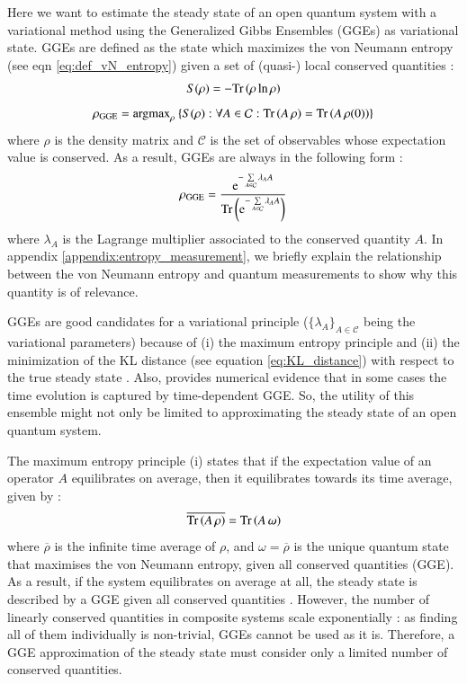 Here we want to estimate the steady state of an open quantum system with a variational method using the Generalized Gibbs Ensembles (GGEs) as variational state. GGEs are defined as the state which maximizes the von Neumann entropy (see eqn \ref{eq:def_vN_entropy}) given a set of (quasi-) local conserved quantities \cite{gogolin2016equilibration}:
\begin{equation}
\label{eq:def_vN_entropy}
S(\rho) = - \mathrm{Tr}\left(  \rho \ln \rho \right)
\end{equation}
\begin{equation}
\label{eq:def_GGE}
\rho_{\rm GGE} = \mathrm{argmax}_\rho \: \{ S(\rho): \\
\forall A \in \mathcal{C} : \mathrm{Tr}\left(  A \, \rho \right) = \mathrm{Tr}\left(  A \, \rho(0) \right) \}
\end{equation}
where $ \rho$ is the density matrix and $\mathcal{C}$ is the set of observables whose expectation value is conserved. As a result, GGEs are always \cite{gogolin2016equilibration} in the following form :
\begin{equation}
    \label{eq:shape_GGEs}
    \rho_{\rm GGE} = \frac{{\rm e}^{- \sum\limits_{A \in \mathcal{C}} \lambda_A A}}{\mathrm{Tr}\left( {\rm e}^{- \sum\limits_{A \in \mathcal{C}} \lambda_A A} \right)}
\end{equation}
where $\lambda_A$ is the Lagrange multiplier associated to the conserved quantity $A$.
In appendix \ref{appendix:entropy_measurement}, we briefly explain the relationship between the von Neumann entropy and quantum measurements to show why this quantity is of relevance. 

GGEs are good candidates for a variational principle ($\{ \lambda_A \}_{A \in \mathcal{C}}$ being the variational parameters) because of (i) the maximum entropy principle \cite{gogolin2016equilibration} and (ii) the minimization of the KL distance (see equation \ref{eq:KL_distance}) with respect to the true steady state \cite{sels2015stationary}. 
Also, \cite{lange2018time} provides numerical evidence that in some cases the time evolution is captured by time-dependent GGE. 
So, the utility of this ensemble might not only be limited to approximating the steady state of an open quantum system.

The maximum entropy principle (i) states \cite{gogolin2016equilibration} that if the expectation value of an operator $A$ equilibrates on average, then it equilibrates towards its time average, given by :
\begin{equation}
    \label{eq:max_entropy_principle}
    \overline{\mathrm{Tr}\left( A \, \rho \right)} = \mathrm{Tr}\left( A \, \omega \right)
\end{equation}
where $\overline{\rho}$ is the infinite time average of $\rho$, and   $\omega = \overline \rho$ is the unique quantum state that maximises the von Neumann entropy, given all conserved quantities (GGE). 
As a result, if the system equilibrates on average at all, the steady state is described by a GGE given all conserved quantities \cite{gogolin2016equilibration}. 
However, the number of linearly conserved quantities in composite systems scale exponentially \cite{gogolin2016equilibration}: as finding all of them individually is non-trivial, GGEs cannot be used as it is. 
Therefore, a GGE approximation of the steady state must consider only a limited number of conserved quantities. 

